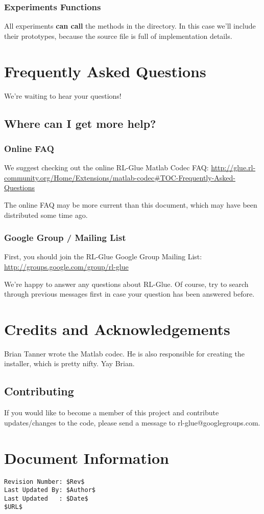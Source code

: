 \documentclass[11pt]{article}
\begin{document}
\subsubsection{Experiments Functions}
All experiments \textbf{can call} the methods in the   directory.
In this case we'll include their prototypes, because the source file is full of implementation details.


\section{Frequently Asked Questions}
We're waiting to hear your questions!

\subsection{Where can I get more help?}
\subsubsection{Online FAQ}
We suggest checking out the online RL-Glue Matlab Codec FAQ:\newline
\url{http://glue.rl-community.org/Home/Extensions/matlab-codec#TOC-Frequently-Asked-Questions}

The online FAQ may be more current than this document, which may have been distributed some time ago.

\subsubsection{Google Group / Mailing List}
First, you should join the RL-Glue Google Group Mailing List:\newline
\url{http://groups.google.com/group/rl-glue}

We're happy to answer any questions about RL-Glue.  Of course, try to search through previous messages first in case your question has been answered before.


\section{Credits and Acknowledgements}
Brian Tanner wrote the Matlab codec. He is also responsible for creating the installer, which is pretty nifty.  Yay Brian.

\subsection{Contributing}
If you would like to become a member of this project and contribute updates/changes to the code, please send a message to rl-glue@googlegroups.com.


\section*{Document Information}
\begin{verbatim}
Revision Number: $Rev$
Last Updated By: $Author$
Last Updated   : $Date$
$URL$
\end{verbatim}
\end{document}
